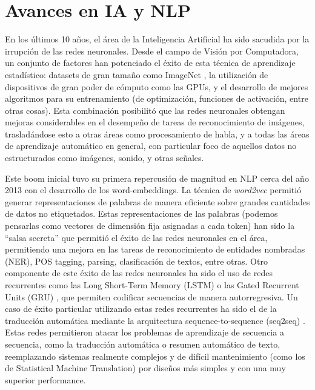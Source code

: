 \section{Avances en IA y NLP}

En los últimos 10 años, el área de la Inteligencia Artificial ha sido sacudida por la irrupción de las redes neuronales. Desde el campo de Visión por Computadora, un conjunto de factores han potenciado el éxito de esta técnica de aprendizaje estadístico: datasets de gran tamaño como ImageNet \cite{imagenet2009deng}, la utilización de dispositivos de gran poder de cómputo como las GPUs, y el desarrollo de mejores algoritmos para su entrenamiento (de optimización, funciones de activación, entre otras cosas). Esta combinación posibilitó que las redes neuronales obtengan mejoras considerables en el desempeño de tareas de reconocimiento de imágenes, trasladándose esto a otras áreas como procesamiento de habla, y a todas las áreas de aprendizaje automático en general, con particular foco de aquellos datos no estructurados como imágenes, sonido, y otras señales.

Este boom inicial tuvo su primera repercusión de magnitud en NLP cerca del año 2013 con el desarrollo de los word-embeddings. La técnica de \emph{word2vec} \cite{mikolov2013distributed} permitió generar representaciones de palabras de manera eficiente sobre grandes cantidades de datos no etiquetados. Estas representaciones de las palabras (podemos pensarlas como vectores de dimensión fija asignadas a cada token) han sido la ``salsa secreta'' que permitió el éxito de las redes neuronales en el área, permitiendo una mejora en las tareas de reconocimiento de entidades nombradas (NER), POS tagging, parsing, clasificación de textos, entre otras. Otro componente de este éxito de las redes neuronales ha sido el uso de redes recurrentes como las Long Short-Term Memory (LSTM) \cite{hochreiter1997long} o las Gated Recurrent Units (GRU) \cite{cho-etal-2014-learning}, que permiten codificar secuencias de manera autorregresiva. Un caso de éxito particular utilizando estas redes recurrentes ha sido el de la traducción automática mediante la arquitectura sequence-to-sequence (seq2seq) \cite{sutskever2014sequence}. Estas redes permitieron atacar los problemas de aprendizaje de secuencia a secuencia, como la traducción automática o resumen automático de texto, reemplazando sistemas realmente complejos y de difícil mantenimiento (como los de Statistical Machine Translation) por diseños más simples y con una muy superior performance.


